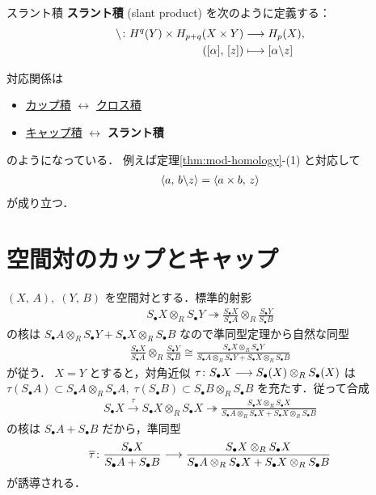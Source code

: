 \documentclass[algtopo_main]{subfiles}
\begin{document}
\begin{mydef}[label=def:slant]{スラント積}
    \textbf{スラント積} (slant product) を次のように定義する：
    \begin{align}
        \backslash \colon H^q(Y) \times H_{p+q} (X \times Y) &\longrightarrow H_p(X),\\ 
        ([\alpha],\, [z]) &\longmapsto [\alpha \backslash z]
    \end{align}
\end{mydef}

対応関係は
\begin{itemize}
    \item \hyperref[def:cup]{カップ積} $\leftrightarrow$ \hyperref[def:cohomology-cross]{クロス積}
    \item \hyperref[def:cap]{キャップ積} $\leftrightarrow$ \textbf{スラント積}
\end{itemize}
のようになっている．
例えば定理\ref{thm:mod-homology}-(1) と対応して
\begin{align}
    \expval{a,\, b \backslash z} = \expval{a \times b,\, z}
\end{align}
が成り立つ．


\section{空間対のカップとキャップ}

$(X,\, A),\; (Y,\, B)$ を空間対とする．標準的射影
\begin{align}
    S_\bullet X \otimes_R S_\bullet Y \twoheadrightarrow \frac{S_\bullet X}{S_\bullet A} \otimes_R \frac{S_\bullet Y}{S_\bullet B}
\end{align}
の核は $S_\bullet A \otimes_R S_\bullet Y + S_\bullet X \otimes_R S_\bullet B$ なので準同型定理から自然な同型
\begin{align}
    \frac{S_\bullet X}{S_\bullet A} \otimes_R \frac{S_\bullet Y}{S_\bullet B} \cong \frac{S_\bullet X \otimes_R S_\bullet Y}{S_\bullet A \otimes_R S_\bullet Y + S_\bullet X \otimes_R S_\bullet B}
\end{align}
が従う．
$X = Y$ とすると，対角近似 $\tau \colon S_\bullet X \longrightarrow  S_\bullet (X) \otimes_R S_\bullet (X)$ は $\tau(S_\bullet A) \subset S_\bullet A \otimes_R S_\bullet A,\; \tau (S_\bullet B) \subset S_\bullet B \otimes_R S_\bullet B$ を充たす．従って合成
\begin{align}
    S_\bullet X \xrightarrow{\tau} S_\bullet X \otimes_R S_\bullet X \twoheadrightarrow \frac{S_\bullet X \otimes_R S_\bullet X}{S_\bullet A \otimes_R S_\bullet X + S_\bullet X \otimes_R S_\bullet B}
\end{align}
の核は $S_\bullet A + S_\bullet B$ だから，準同型
\begin{align}
    \overline{\tau} \colon \frac{S_\bullet X}{S_\bullet A + S_\bullet B} \longrightarrow \frac{S_\bullet X \otimes_R S_\bullet X}{S_\bullet A \otimes_R S_\bullet X + S_\bullet X \otimes_R S_\bullet B}
\end{align}
が誘導される．
\end{document}
